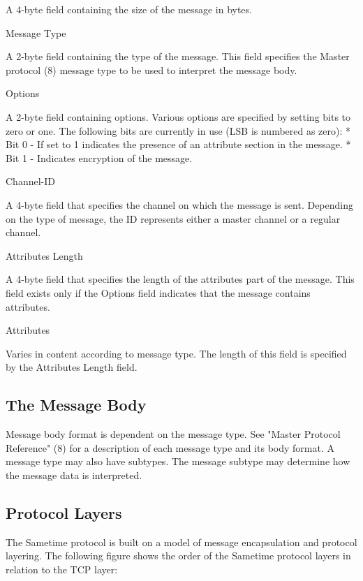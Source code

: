 \documentclass[titlepage,oneside]{book}
\begin{document}
\subpar{} A 4-byte field containing the size of the message in bytes.

\par{} Message Type

\subpar{} A 2-byte field containing the type of the message. This
field specifies the Master protocol (8) message type to be used to
interpret the message body.

\par{} Options

\subpar{} A 2-byte field containing options. Various options are
specified by setting bits to zero or one. The following bits are
currently in use (LSB is numbered as zero): * Bit 0 - If set to 1
indicates the presence of an attribute section in the message.  * Bit
1 - Indicates encryption of the message.

\par{} Channel-ID

\subpar{} A 4-byte field that specifies the channel on which the
message is sent. Depending on the type of message, the ID represents
either a master channel or a regular channel.

\par{} Attributes Length

\subpar{} A 4-byte field that specifies the length of the attributes
part of the message. This field exists only if the Options field
indicates that the message contains attributes.

\par{} Attributes

\subpar{} Varies in content according to message type. The length of
this field is specified by the Attributes Length field.

\subsection{The Message Body}

\par{} Message body format is dependent on the message type. See
"Master Protocol Reference" (8) for a description of each message type
and its body format. A message type may also have subtypes. The
message subtype may determine how the message data is interpreted.

\subsection{Protocol Layers}

\par{} The Sametime protocol is built on a model of message
encapsulation and protocol layering. The following figure shows the
order of the Sametime protocol layers in relation to the TCP layer:
\end{document}

